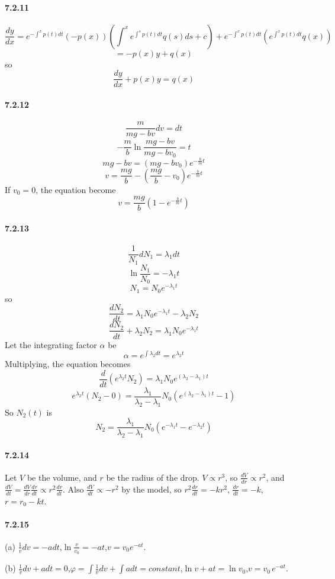 \documentclass[a4paper]{article}
\begin{document}
\paragraph{7.2.11}
\[
\frac{dy}{dx}=e^{-\int^xp(t)dt}\left(-p(x)\right)\left(\int^xe^{\int^sp(t)dt}q(s)ds+c \right)+e^{-\int^xp(t)dt}\left(e^{\int^xp(t)dt}q(x)\right)
\]
\[
=-p(x)y+q(x)
\]
so
\[
\frac{dy}{dx}+p(x)y=q(x)
\]

\paragraph{7.2.12}
\[
\frac{m}{mg-bv}dv=dt
\]
\[
-\frac{m}{b}\ln\frac{mg-bv}{mg-bv_0}=t
\]
\[
mg-bv=(mg-bv_0)e^{-\frac{b}{m}t}
\]
\[
v=\frac{mg}{b}-(\frac{mg}{b}-v_0)e^{-\frac{b}{m}t}
\]
If $v_0=0$, the equation become
\[
v=\frac{mg}{b}(1-e^{-\frac{b}{m}t})
\]

\paragraph{7.2.13}
\[
\frac{1}{N_1}dN_1=\lambda_1dt
\]
\[
\ln\frac{N_1}{N_0}=-\lambda_1t
\]
\[
N_1=N_0e^{-\lambda_1t}
\]
so
\[
\frac{dN_2}{dt}=\lambda_1N_0e^{-\lambda_1t}-\lambda_2N_2
\]
\[
\frac{dN_2}{dt}+\lambda_2N_2=\lambda_1N_0e^{-\lambda_1t}
\]
Let the integrating factor $\alpha$ be
\[
\alpha=e^{\int\lambda_2dt}=e^{\lambda_2t}
\]
Multiplying, the equation becomes
\[
\frac{d}{dt}(e^{\lambda_2t}N_2)=\lambda_1N_0e^{(\lambda_2-\lambda_1)t}
\]
\[
e^{\lambda_2t}(N_2-0)=\frac{\lambda_1}{\lambda_2-\lambda_1}N_0\left(e^{(\lambda_2-\lambda_1)t}-1 \right)
\]
So $N_2(t)$ is
\[
N_2=\frac{\lambda_1}{\lambda_2-\lambda_1}N_0(e^{-\lambda_1t}-e^{-\lambda_2t})
\]

\paragraph{7.2.14}
Let $V$ be the volume, and $r$ be the radius of the drop.
$V\propto r^3$, so $\frac{dV}{dr}\propto r^2$, and $\frac{dV}{dt}=\frac{dV}{dr}\frac{dr}{dt}\propto r^2\frac{dr}{dt}$. Also $\frac{dV}{dt}\propto -r^2$ by the model, so $r^2\frac{dr}{dt}=-kr^2$,\;
$\frac{dr}{dt}=-k$,\;
$r=r_0-kt$.

\paragraph{7.2.15}
(a) 
$\frac{1}{v}dv=-adt$,\quad$\ln\frac{v}{v_0}=-at$,\quad$v=v_0e^{-at}$.

(b) $\frac{1}{v}dv+adt=0$,\quad $\varphi=\int\frac{1}{v}dv+\int adt=constant$,\quad $\ln v+at=\ln v_0$,\quad $v=v_0\,e^{-at}$.
\end{document}
